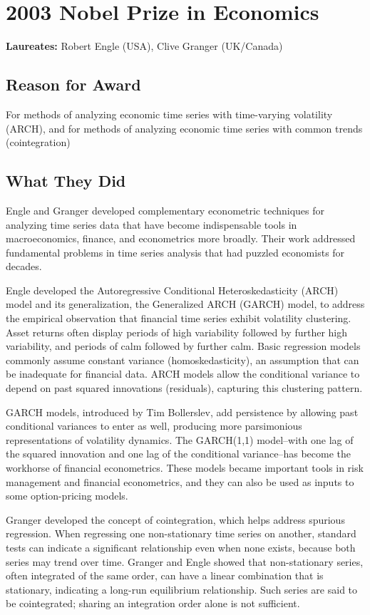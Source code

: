 \chapter{2003 Nobel Prize in Economics}
\textbf{Laureates: }Robert Engle (USA), Clive Granger (UK/Canada)

\section*{Reason for Award}
For methods of analyzing economic time series with time-varying volatility
(ARCH), and for methods of analyzing economic time series with common trends
(cointegration)

\section{What They Did}
Engle and Granger developed complementary econometric techniques for analyzing
time series data that have become indispensable tools in macroeconomics,
finance, and econometrics more broadly. Their work addressed fundamental
problems in time series analysis that had puzzled economists for decades.

Engle developed the Autoregressive Conditional Heteroskedasticity (ARCH) model
and its generalization, the Generalized ARCH (GARCH) model, to address the
empirical observation that financial time series exhibit volatility clustering.
Asset returns often display periods of high variability followed by further high
variability, and periods of calm followed by further calm. Basic regression
models commonly assume constant variance (homoskedasticity), an assumption that
can be inadequate for financial data. ARCH models allow the conditional variance
to depend on past squared innovations (residuals), capturing this clustering
pattern.

GARCH models, introduced by Tim Bollerslev, add persistence by allowing past
conditional variances to enter as well, producing more parsimonious
representations of volatility dynamics. The GARCH(1,1) model--with one lag of
the squared innovation and one lag of the conditional variance--has become the
workhorse of financial econometrics. These models became important tools in risk
management and financial econometrics, and they can also be used as inputs to
some option-pricing models.

Granger developed the concept of cointegration, which helps address spurious
regression. When regressing one non-stationary time series on another, standard
tests can indicate a significant relationship even when none exists, because both
series may trend over time. Granger and Engle showed that non-stationary series,
often integrated of the same order, can have a linear combination that is
stationary, indicating a long-run equilibrium relationship. Such series are said
to be cointegrated; sharing an integration order alone is not sufficient.

